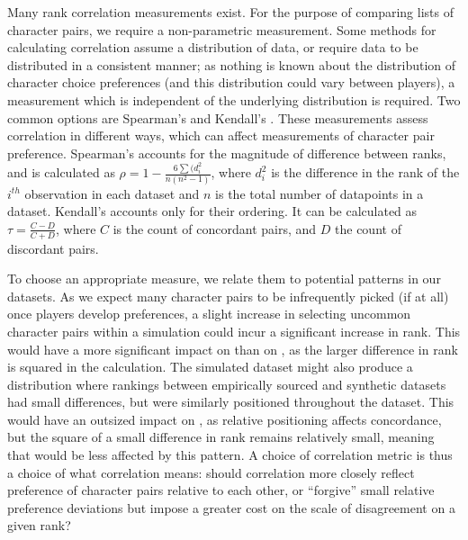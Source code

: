 Many rank correlation measurements exist. For the purpose of comparing lists of
character pairs, we require a non-parametric measurement. Some methods for
calculating correlation assume a distribution of data, or require data to be
distributed in a consistent manner; as nothing is known about the distribution
of character choice preferences (and this distribution could vary between
players), a measurement which is independent of the underlying distribution is
required. Two common options are Spearman's \rho and Kendall's \tau.
These measurements assess correlation in different ways, which can affect
measurements of character pair preference. Spearman's \rho accounts for the
magnitude of difference between ranks, and is calculated as $\rho = 1 - \frac{6
\sum (d^{2}_{i}}{n(n^{2}-1)}$, where $d^{2}_{i}$ is the difference in the rank
of the $i^{th}$ observation in each dataset and $n$ is the total number of
datapoints in a dataset. Kendall's \tau{} accounts only for their ordering. It
can be calculated as $\tau = \frac{C - D}{C + D}$, where $C$ is the count of
concordant pairs, and $D$ the count of discordant pairs.

To choose an appropriate measure, we relate them to potential patterns in our
datasets. As we expect many character pairs to be infrequently picked (if at
all) once players develop preferences, a slight increase in selecting uncommon
character pairs within a simulation could incur a significant increase in rank.
This would have a more significant impact on \rho{} than on \tau{}, as the
larger difference in rank is squared in the calculation. The simulated dataset
might also produce a distribution where rankings between empirically sourced and
synthetic datasets had small differences, but were similarly positioned
throughout the dataset. This would have an outsized impact on \tau{}, as
relative positioning affects concordance, but the square of a small difference
in rank remains relatively small, meaning that \rho{} would be less affected by
this pattern. A choice of correlation metric is thus a choice of what
correlation means: should correlation more closely reflect preference of
character pairs relative to each other, or ``forgive'' small relative preference
deviations but impose a greater cost on the scale of disagreement on a given
rank?

